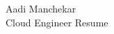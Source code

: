 \documentclass{article}
\begin{document}
\begin{center}
    \Huge Aadi Manchekar \\
    \Large Cloud Engineer Resume
\end{center}
\end{document}
